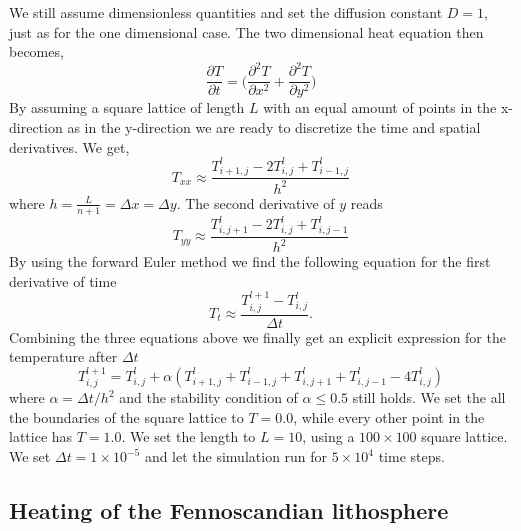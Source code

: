\documentclass{article}
\begin{document}
\begin{multicols}{2}
We still assume dimensionless quantities and set the diffusion constant $D=1$, just as for the one dimensional case. The two dimensional heat equation then becomes,
\begin{equation}
\frac{\partial T}{\partial t} = \bigg( \frac{\partial^2 T}{\partial x^2} + \frac{\partial^2 T}{\partial y^2} \bigg)
\end{equation}
By assuming a square lattice of length $L$ with an equal amount of points in the x-direction as in the y-direction we are ready to discretize the time and spatial derivatives. We get,
\begin{equation}
T_{xx} \approx \frac{T^l_{i+1, j}-2T^l_{i,j}+T^l_{i-1,j}}{h^2}
\end{equation}
where $h= \frac{L}{n+1}=\Delta x = \Delta y$. The second derivative of $y$ reads
\begin{equation}
T_{yy} \approx \frac{T^l_{i, j+1}-2T^l_{i,j}+T^l_{i,j-1}}{h^2}
\end{equation}
By using the forward Euler method we find the following equation for the first derivative of time 
\begin{equation}
T_t\approx \frac{T^{l+1}_ {i,j}-T^l_{i,j}}{\Delta t}.
\end{equation}
Combining the three equations above we finally get an explicit expression for the temperature after $\Delta t$
\begin{equation}
T^{l+1}_{i,j}=T_{i,j}^l+\alpha(T_{i+1,j}^l+T_{i-1,j}^l+T_{i,j+1}^l+T_{i,j-1}^l-4T_{i,j}^l)
\end{equation}
where $\alpha = \Delta t/ h^2$ and the stability condition of $\alpha\leq 0.5$ still holds. We set the all the boundaries of the square lattice to $T=0.0$, while every other point in the lattice has $T=1.0$. We set the length to $L=10$, using a $100 \times 100$ square lattice. We set $\Delta t = 1\times 10^{-5}$ and let the simulation run for $5\times10^4$ time steps. 

\subsection{Heating of the Fennoscandian lithosphere}


\end{multicols}
\end{document}
